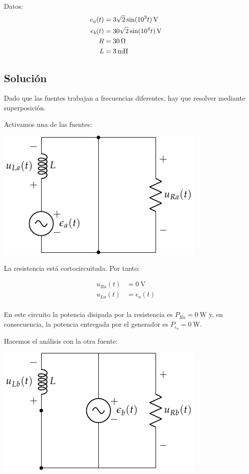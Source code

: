 \documentclass[12pt]{article}
\begin{document}
Datos:
\begin{align*}
  e_a(t) &= \SI[parse-numbers=false]{3\sqrt{2} \sin(10^3 t)}{\volt}\\
  e_b(t) &= \SI[parse-numbers=false]{30\sqrt{2} \sin(10^4 t)}{\volt}\\
  R &= \SI{30}{\ohm}\\
  L &= \SI{3}{\milli\henry}
\end{align*}


\noindent\hrulefill

\subsection*{Solución}

Dado que las fuentes trabajan a frecuencias diferentes, hay que resolver mediante superposición.

Activamos una de las fuentes:
\begin{center}
\includegraphics{../figs/superposicion2_A}
\end{center}

La resistencia está cortocircuitada. Por tanto:

\begin{align*}
  u_{Ra}(t) &= \SI{0}{\volt}\\
  u_{La}(t) &= \epsilon_a(t)\\  
\end{align*}

En este circuito la potencia disipada por la resistencia es $P_{Ra} = \SI{0}{\watt}$ y, en consecuencia, la potencia entregada por el generador es $P_{\epsilon_a} = \SI{0}{\watt}$.

Hacemos el análisis con la otra fuente:

\begin{center}
\includegraphics{../figs/superposicion2_B}
\end{center}
\end{document}
